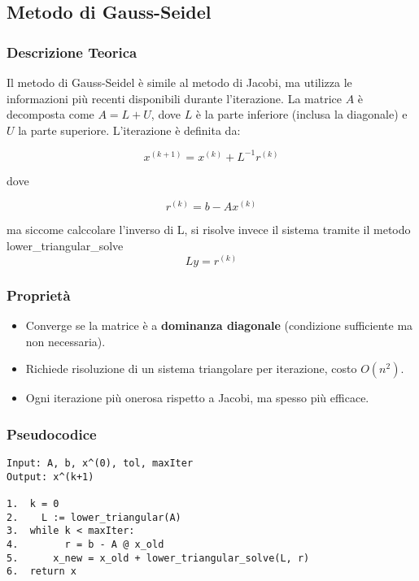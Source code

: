 \subsection{Metodo di Gauss-Seidel}

\subsubsection*{Descrizione Teorica}

Il metodo di Gauss-Seidel è simile al metodo di Jacobi, ma utilizza le informazioni più recenti disponibili durante l'iterazione. La matrice $A$ è decomposta come $A = L + U$, dove $L$ è la parte inferiore (inclusa la diagonale) e $U$ la parte superiore. L'iterazione è definita da:

\[
x^{(k+1)} = x^{(k)} + L^{-1}r^{(k)}
\]

dove

\[
r^{(k)} = b - Ax^{(k)}
\]

ma siccome calccolare l'inverso di L, si risolve invece il sistema tramite il metodo lower\_triangular\_solve
\[
Ly = r^{(k)} 
\]


\subsubsection*{Proprietà}
\begin{itemize}
    \item Converge se la matrice è a \textbf{dominanza diagonale} (condizione sufficiente ma non necessaria).
    \item Richiede risoluzione di un sistema triangolare per iterazione, costo \(O(n^2)\).
    \item Ogni iterazione più onerosa rispetto a Jacobi, ma spesso più efficace.
\end{itemize}

\subsubsection*{Pseudocodice}
\begin{footnotesize}
\begin{verbatim}
Input: A, b, x^(0), tol, maxIter
Output: x^(k+1)

1.  k = 0
2.    L := lower_triangular(A)
3.  while k < maxIter:
4.        r = b - A @ x_old
5.      x_new = x_old + lower_triangular_solve(L, r)
6.  return x
\end{verbatim}
\end{footnotesize}

